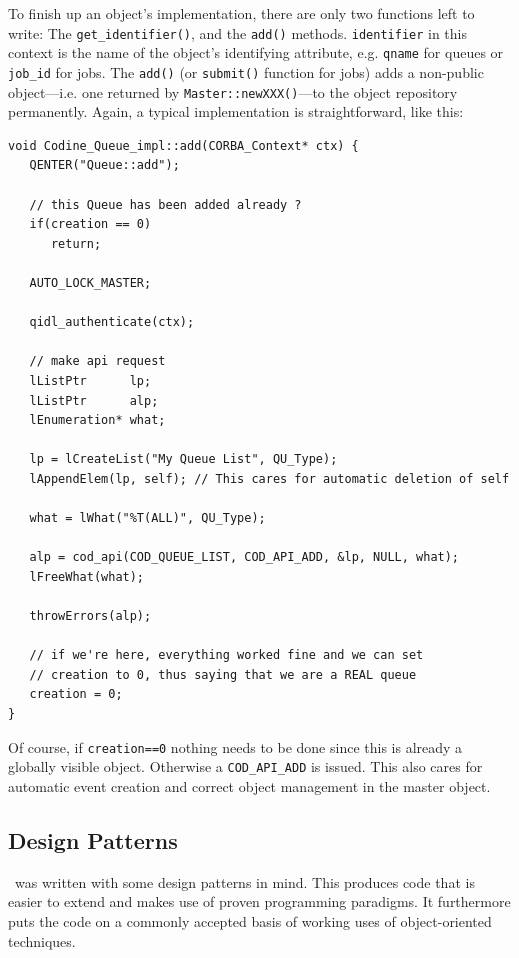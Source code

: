 To finish up an object's implementation, there are only two functions left to
write: The \texttt{get\_identifier()}, and the \texttt{add()} methods.
\texttt{identifier} in this context is the name of the object's identifying
attribute, e.g. \texttt{qname} for queues or \texttt{job\_id} for jobs. The
\texttt{add()} (or \texttt{submit()} function for jobs) adds a non-public
object---i.e. one returned by \texttt{Master::newXXX()}---to the object
repository permanently. Again, a typical implementation is straightforward,
like this:

\begin{Verbatim}[fontsize=\small, frame=single]
void Codine_Queue_impl::add(CORBA_Context* ctx) {
   QENTER("Queue::add");

   // this Queue has been added already ?
   if(creation == 0)
      return;
   
   AUTO_LOCK_MASTER;

   qidl_authenticate(ctx);

   // make api request
   lListPtr      lp;
   lListPtr      alp;
   lEnumeration* what;
   
   lp = lCreateList("My Queue List", QU_Type);
   lAppendElem(lp, self); // This cares for automatic deletion of self

   what = lWhat("%T(ALL)", QU_Type);

   alp = cod_api(COD_QUEUE_LIST, COD_API_ADD, &lp, NULL, what);
   lFreeWhat(what);

   throwErrors(alp);

   // if we're here, everything worked fine and we can set
   // creation to 0, thus saying that we are a REAL queue
   creation = 0;
}
\end{Verbatim}

Of course, if \texttt{creation==0} nothing needs to be done since this is
already a globally visible object. Otherwise a \texttt{COD\_API\_ADD} is
issued. This also cares for automatic event creation and correct object
management in the master object.

\subsection{\label{s_prog_patterns}Design Patterns}
\qidl\ was written with some design patterns in mind. This produces code that
is easier to extend and makes use of proven programming paradigms. It
furthermore puts the code on a commonly accepted basis of working uses of
object-oriented techniques.

